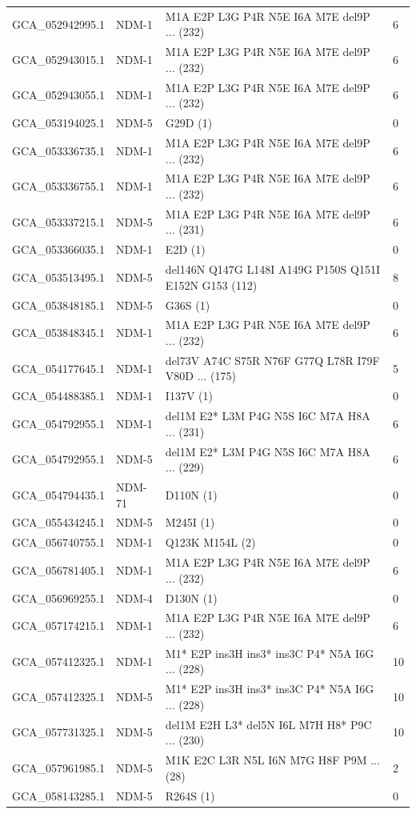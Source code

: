 \begin{longtable}{llll}
GCA\_052942995.1&NDM-1&M1A E2P L3G P4R N5E I6A M7E del9P ... (232)&6\\
GCA\_052943015.1&NDM-1&M1A E2P L3G P4R N5E I6A M7E del9P ... (232)&6\\
GCA\_052943055.1&NDM-1&M1A E2P L3G P4R N5E I6A M7E del9P ... (232)&6\\
GCA\_053194025.1&NDM-5&G29D (1)&0\\
GCA\_053336735.1&NDM-1&M1A E2P L3G P4R N5E I6A M7E del9P ... (232)&6\\
GCA\_053336755.1&NDM-1&M1A E2P L3G P4R N5E I6A M7E del9P ... (232)&6\\
GCA\_053337215.1&NDM-5&M1A E2P L3G P4R N5E I6A M7E del9P ... (231)&6\\
GCA\_053366035.1&NDM-1&E2D (1)&0\\
GCA\_053513495.1&NDM-5&del146N Q147G L148I A149G P150S Q151I E152N G153 (112)&8\\
GCA\_053848185.1&NDM-5&G36S (1)&0\\
GCA\_053848345.1&NDM-1&M1A E2P L3G P4R N5E I6A M7E del9P ... (232)&6\\
GCA\_054177645.1&NDM-1&del73V A74C S75R N76F G77Q L78R I79F V80D ... (175)&5\\
GCA\_054488385.1&NDM-1&I137V (1)&0\\
GCA\_054792955.1&NDM-1&del1M E2* L3M P4G N5S I6C M7A H8A ... (231)&6\\
GCA\_054792955.1&NDM-5&del1M E2* L3M P4G N5S I6C M7A H8A ... (229)&6\\
GCA\_054794435.1&NDM-71&D110N (1)&0\\
GCA\_055434245.1&NDM-5&M245I (1)&0\\
GCA\_056740755.1&NDM-1&Q123K M154L (2)&0\\
GCA\_056781405.1&NDM-1&M1A E2P L3G P4R N5E I6A M7E del9P ... (232)&6\\
GCA\_056969255.1&NDM-4&D130N (1)&0\\
GCA\_057174215.1&NDM-1&M1A E2P L3G P4R N5E I6A M7E del9P ... (232)&6\\
GCA\_057412325.1&NDM-1&M1* E2P ins3H ins3* ins3C P4* N5A I6G ... (228)&10\\
GCA\_057412325.1&NDM-5&M1* E2P ins3H ins3* ins3C P4* N5A I6G ... (228)&10\\
GCA\_057731325.1&NDM-5&del1M E2H L3* del5N I6L M7H H8* P9C ... (230)&10\\
GCA\_057961985.1&NDM-5&M1K E2C L3R N5L I6N M7G H8F P9M ... (28)&2\\
GCA\_058143285.1&NDM-5&R264S (1)&0\\

\end{longtable}
